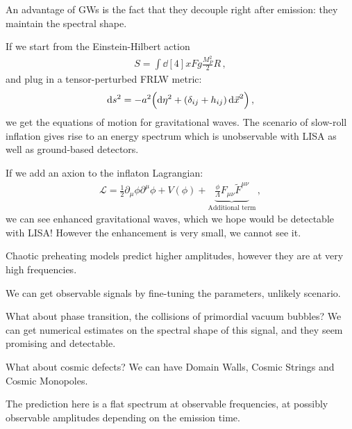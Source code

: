 \documentclass[main.tex]{subfiles}
\begin{document}
An advantage of GWs is the fact that they decouple right after emission: they maintain the spectral shape. 

If we start from the Einstein-Hilbert action 
%
\begin{align}
S = \int \dd[4]{x} F g \frac{M_P^2}{2} R
\,,
\end{align}
%
and plug in a tensor-perturbed FRLW metric: 
%
\begin{align}
\dd{s^2} = - a^2 \qty(\dd{\eta^2  } + (\delta_{ij} + h_{ij}) \dd{\vec{x}}^2)
\,,
\end{align}
%
we get the equations of motion for gravitational waves. 
The scenario of slow-roll inflation gives rise to an energy spectrum which is unobservable with LISA as well as ground-based detectors. 

If we add an axion to the inflaton Lagrangian: 
%
\begin{align}
\mathcal{L} = \frac{1}{2} \partial_{\mu } \phi \partial^{\mu }\phi + V(\phi ) + \underbrace{\frac{\phi}{\Lambda } F_{\mu \nu } \widetilde{F}^{\mu \nu }}_{\text{Additional term}} 
\,,
\end{align}
%
we can see enhanced gravitational waves, which we hope would be detectable with LISA! However the enhancement is very small, we cannot see it. 

Chaotic preheating models predict higher amplitudes, however they are at very high frequencies. 

We can get observable signals by fine-tuning the parameters, unlikely scenario. 

What about phase transition, the collisions of primordial vacuum bubbles? We can get numerical estimates on the spectral shape of this signal, and they seem promising and detectable. 

What about cosmic defects? We can have Domain Walls, Cosmic Strings and Cosmic Monopoles. 

The prediction here is a flat spectrum at observable frequencies, at possibly observable amplitudes depending on the emission time. 
\end{document}

